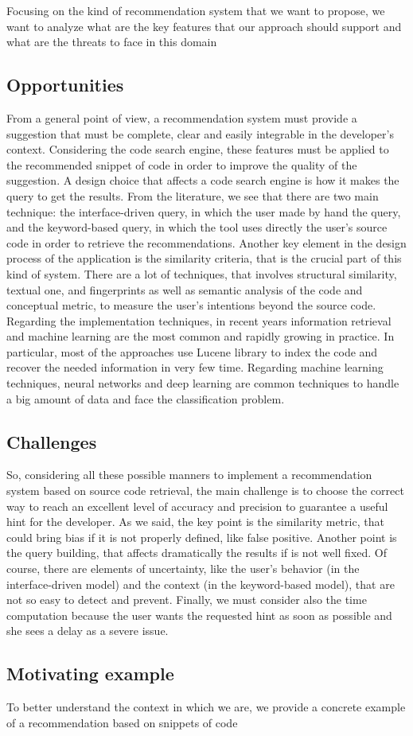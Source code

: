 Focusing on the kind of recommendation system that we want to propose, we want to analyze what are the key features that our approach should support and what are the threats to face in this domain


\subsection{Opportunities}
From a general point of view, a recommendation system must provide a suggestion that must be complete, clear and easily integrable in the developer's context. Considering the code search engine, these features must be applied to the recommended snippet of code in order to improve the quality of the suggestion. A design choice that affects a code search engine is how it makes the query to get the results. From the literature, we see that there are two main technique: the interface-driven query, in which the user made by hand the query, and the keyword-based query, in which the tool uses directly the user's source code in order to retrieve the recommendations. Another key element in the design process of the application is the similarity criteria, that is the crucial part of this kind of system. There are a lot of techniques, that involves structural similarity, textual one, and fingerprints as well as semantic analysis of the code and conceptual metric, to measure the user's intentions beyond the source code. Regarding the implementation techniques, in recent years information retrieval and machine learning are the most common and rapidly growing in practice. In particular, most of the approaches use Lucene library to index the code and recover the needed information in very few time. Regarding machine learning techniques, neural networks and deep learning are common techniques to handle a big amount of data and face the classification problem. 

\subsection{Challenges}
So, considering all these possible manners to implement a recommendation system based on source code retrieval,  the main challenge is to choose the correct way to reach an excellent level of accuracy and precision to guarantee a useful hint for the developer. As we said, the key point is the similarity metric, that could bring bias if it is not properly defined, like false positive. Another point is the query building, that affects dramatically the results if is not well fixed. Of course, there are elements of uncertainty, like the user's behavior (in the interface-driven model) and the context (in the keyword-based model), that are not so easy to detect and prevent. Finally, we must consider also the time computation because the user wants the requested hint as soon as possible and she sees a delay as a severe issue. 

\subsection{Motivating example}
To better understand the context in which we are, we provide a concrete example of a recommendation based on snippets of code